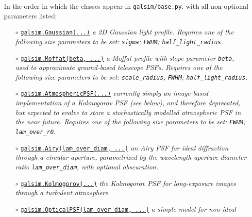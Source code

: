 \documentclass[preprint,11pt]{aastex}
\begin{document}
In the order in which
the classes appear in {\tt galsim/base.py}, with all non-optional
parameters listed:
\begin{itemize}
\item[$\circ$]
  \href{http://galsim-developers.github.com/GalSim/classgalsim_1_1base_1_1_gaussian.html}{\texttt{galsim.Gaussian(...)}}
  \newline \emph{a 2D Gaussian light profile. Requires one of the
    following size parameters to be set: \texttt{sigma}; \texttt{FWHM}; \texttt{half\_light\_radius}.}
\item[$\circ$]
  \href{http://galsim-developers.github.com/GalSim/classgalsim_1_1base_1_1_moffat.html}{\texttt{galsim.Moffat(beta,
    ...)}}
  \newline \emph{a Moffat profile with slope parameter \texttt{beta}, used to approximate ground-based
    telescope PSFs. Requires one of the
    following size parameters to be set: \texttt{scale\_radius}; \texttt{FWHM}; \texttt{half\_light\_radius}.}
\item[$\circ$]
  \href{http://galsim-developers.github.com/GalSim/classgalsim_1_1base_1_1_atmospheric_p_s_f.html}{\texttt{galsim.AtmosphericPSF(...)}}
  \newline \emph{currently simply an image-based
  implementation of a Kolmogorov PSF (see below), and therefore deprecated, but expected to evolve to
  store a stochastically modelled atmospheric PSF in the near future.
Requires one of the
    following size parameters to be set: \texttt{FWHM}; \texttt{lam\_over\_r0}.}
\item[$\circ$]
  \href{http://galsim-developers.github.com/GalSim/classgalsim_1_1base_1_1_airy.html}{\texttt{galsim.Airy(lam\_over\_diam,
      ...)}} \newline \emph{an Airy PSF for ideal diffraction
  through a circular aperture, parametrized by the wavelength-aperture
  diameter ratio \texttt{lam\_over\_diam}, with optional obscuration.}
\item[$\circ$] \href{http://galsim-developers.github.com/GalSim/classgalsim_1_1base_1_1_kolmogorov.html}{\texttt{galsim.Kolmogorov(...)}} \newline \emph{the Kolmogorov PSF for long-exposure
  images through a turbulent atmosphere.}
\item[$\circ$]
  \href{http://galsim-developers.github.com/GalSim/classgalsim_1_1base_1_1_optical_p_s_f.html}{\texttt{galsim.OpticalPSF(lam\_over\_diam,
      ...)}} \newline \emph{a simple model for non-ideal
}
\end{itemize}
\end{document}
